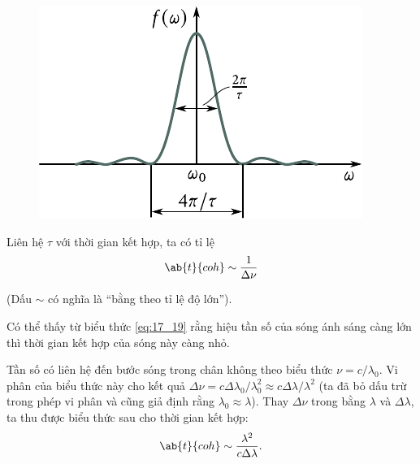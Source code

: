 \begin{figure}[!htb]
	\begin{center}
		\includegraphics[scale=1]{figures/ch_17/fig_17_5.pdf}
		\caption[]{}
		\label{fig:17_5}
	\end{center}
	\vspace{-0.9cm}
\end{figure}

Liên hệ $\tau$ với thời gian kết hợp, ta có tỉ lệ
\begin{equation}\label{eq:17_19}
    \ab{t}{coh} \sim \frac{1}{\Delta{\nu}}
\end{equation}

\noindent
(Dấu $\sim$ có nghĩa là ``bằng theo tỉ lệ độ lớn'').

Có thể thấy từ biểu thức \eqref{eq:17_19} rằng hiệu tần số của sóng ánh sáng càng lớn thì thời gian kết hợp của sóng này càng nhỏ.

Tần số có liên hệ đến bước sóng trong chân không theo biểu thức $\nu=c/\lambda_0$.
Vi phân của biểu thức này cho kết quả $\Delta{\nu}=c\Delta{\lambda_0}/\lambda_0^2 \approx c \Delta{\lambda}/\lambda^2$ (ta đã bỏ dấu trừ trong phép vi phân và cũng giả định rằng $\lambda_0\approx\lambda$).
Thay $\Delta{\nu}$ trong  bằng $\lambda$ và $\Delta{\lambda}$, ta thu được biểu thức sau cho thời gian kết hợp:
\begin{equation}\label{eq:17_20}
    \ab{t}{coh} \sim \frac{\lambda^2}{c \Delta{\lambda}}.
\end{equation}


